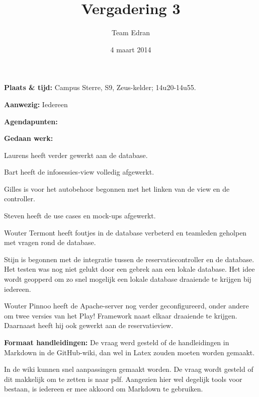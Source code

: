 \documentclass[11pt,a4paper,oneside]{article}
\title{Vergadering 3}
\author{Team Edran}
\date{4 maart 2014}
\renewenvironment{itemize}[1]{\begin{compactitem}#1}{\end{compactitem}}
\begin{document}
\maketitle

\textbf{Plaats \& tijd:}
Campus Sterre, S9, Zeus-kelder; 14u20-14u55.

\textbf{Aanwezig:}
Iedereen

\textbf{Agendapunten:}

\begin{itemize}
    \item \textbf{Gedaan werk:}
        \begin{itemize}
            \item Laurens heeft verder gewerkt aan de database.
            \item Bart heeft de infosessies-view volledig afgewerkt.
            \item Gilles is voor het autobehoor begonnen met het linken van de
                view en de controller.
            \item Steven heeft de use cases en mock-ups afgewerkt.
            \item Wouter Termont heeft foutjes in de database verbeterd en
                teamleden geholpen met vragen rond de database.
            \item Stijn is begonnen met de integratie tussen de
                reservatiecontroller en de database. Het testen was nog niet
                gelukt door een gebrek aan een lokale database. Het idee wordt
                geopperd om zo snel mogelijk een lokale database draaiende te
                krijgen bij iedereen.
            \item Wouter Pinnoo heeft de Apache-server nog verder
                geconfigureerd, onder andere om twee versies van het Play!
                Framework naast elkaar draaiende te krijgen. Daarnaast heeft
                hij ook gewerkt aan de reservatieview.
        \end{itemize}

    \item \textbf{Formaat handleidingen:}
        De vraag werd gesteld of de handleidingen in Markdown in de
        GitHub-wiki, dan wel in Latex zouden moeten worden gemaakt.

        In de wiki kunnen snel aanpassingen gemaakt worden. De vraag wordt
        gesteld of dit makkelijk om te zetten is naar pdf. Aangezien hier wel
        degelijk tools voor bestaan, is iedereen er mee akkoord om Markdown te
        gebruiken.


\end{itemize}
\end{document}
